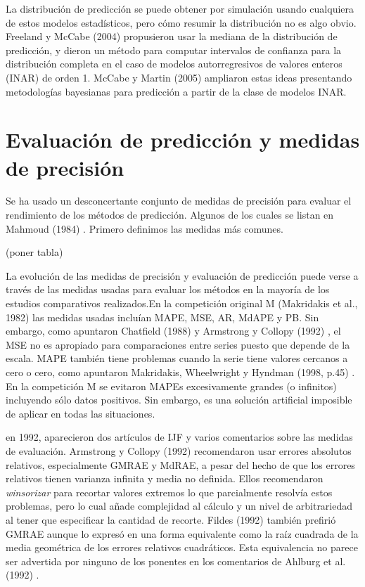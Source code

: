 \documentclass{llncs}
\begin{document}
La distribución de predicción se puede obtener por simulación usando cualquiera de estos modelos estadísticos, pero cómo resumir la distribución no es algo obvio. Freeland y McCabe (2004) propusieron usar la mediana de la distribución de predicción, y dieron un método para computar intervalos de confianza para la distribución completa en el caso de modelos autorregresivos de valores enteros (INAR) de orden 1. McCabe y Martin (2005) ampliaron estas ideas presentando metodologías bayesianas para predicción a partir de la clase de modelos INAR.

\section{Evaluación de predicción y medidas de precisión}
Se ha usado un desconcertante conjunto de medidas de precisión para evaluar el rendimiento de los métodos de predicción. Algunos de los cuales se listan en Mahmoud (1984) \cite{Mahmoud1984139}. Primero definimos las medidas más comunes.

(poner tabla)

La evolución de las medidas de precisión y evaluación de predicción puede verse a través de las medidas usadas para evaluar los métodos en la mayoría de los estudios comparativos realizados.En la competición original M (Makridakis et al., 1982) \cite{Makridakis1982111} las medidas usadas incluían MAPE, MSE, AR, MdAPE y PB. Sin embargo, como apuntaron Chatfield (1988) \cite{Chatfield198819} y Armstrong y Collopy (1992) \cite{Armstrong199269}, el MSE no es apropiado para comparaciones entre series puesto que depende de la escala. MAPE también tiene problemas cuando la serie tiene valores cercanos a cero o cero, como apuntaron Makridakis, Wheelwright y Hyndman (1998, p.45) \cite{Makridakis1983}. En la competición M se evitaron MAPEs excesivamente grandes (o infinitos) incluyendo sólo datos positivos. Sin embargo, es una solución artificial imposible de aplicar en todas las situaciones.

en 1992, aparecieron dos artículos de IJF y varios comentarios sobre las medidas de evaluación. Armstrong y Collopy (1992) \cite{Armstrong199269} recomendaron usar errores absolutos relativos, especialmente GMRAE y MdRAE, a pesar del hecho de que los errores relativos tienen varianza infinita y media no definida. Ellos recomendaron \emph{winsorizar} para recortar valores extremos lo que parcialmente resolvía estos problemas, pero lo cual añade complejidad al cálculo y un nivel de arbitrariedad al tener que especificar la cantidad de recorte. Fildes (1992) \cite{Fildes199281} también prefirió GMRAE aunque lo expresó en una forma equivalente como la raíz cuadrada de la media geométrica de los errores relativos cuadráticos. Esta equivalencia no parece ser advertida por ninguno de los ponentes en los comentarios de Ahlburg et al. (1992) \cite{Chatfield1992100}. 
\end{document}
